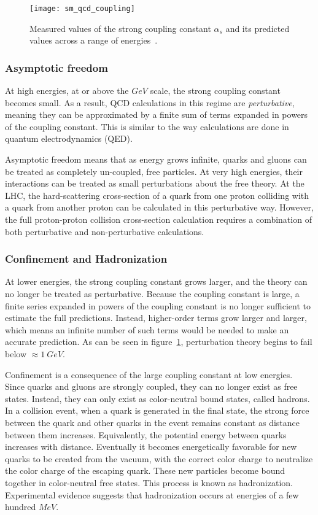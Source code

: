 \begin{figure}[!ht]
    \centering
\texttt{[image: sm\_qcd\_coupling]}
\caption{Measured values of the strong coupling constant $\alpha_s$ and its predicted values across a range of energies~\cite{sm-review-2014}.}
\label{fig:sm_qcd_coupling}
\end{figure}

\subsubsection{Asymptotic freedom}

At high energies, at or above the $GeV$ scale, the strong coupling constant becomes small.
As a result, QCD calculations in this regime are \textit{perturbative}, meaning they can be approximated by a finite sum of terms expanded in powers of the coupling constant.
This is similar to the way calculations are done in quantum electrodynamics (QED).

Asymptotic freedom means that as energy grows infinite, quarks and gluons can be treated as completely un-coupled, free particles.
At very high energies, their interactions can be treated as small perturbations about the free theory.
At the LHC, the hard-scattering cross-section of a quark from one proton colliding with a quark from another proton can be calculated in this perturbative way.
However, the full proton-proton collision cross-section calculation requires a combination of both perturbative and non-perturbative calculations.

\subsubsection{Confinement and Hadronization}

At lower energies, the strong coupling constant grows larger, and the theory can no longer be treated as perturbative.
Because the coupling constant is large, a finite series expanded in powers of the coupling constant is no longer sufficient to estimate the full predictions.
Instead, higher-order terms grow larger and larger, which means an infinite number of such terms would be needed to make an accurate prediction.
As can be seen in figure~\ref{fig:sm_qcd_coupling}, perturbation theory begins to fail below $\approx1~GeV$.

Confinement is a consequence of the large coupling constant at low energies.
Since quarks and gluons are strongly coupled, they can no longer exist as free states.
Instead, they can only exist as color-neutral bound states, called hadrons.
In a collision event, when a quark is generated in the final state, the strong force between the quark and other quarks in the event remains constant as distance between them increases.
Equivalently, the potential energy between quarks increases with distance.
Eventually it becomes energetically favorable for new quarks to be created from the vacuum, with the correct color charge to neutralize the color charge of the escaping quark.
These new particles become bound together in color-neutral free states.
This process is known as hadronization.
Experimental evidence suggests that hadronization occurs at energies of a few hundred $MeV$.

